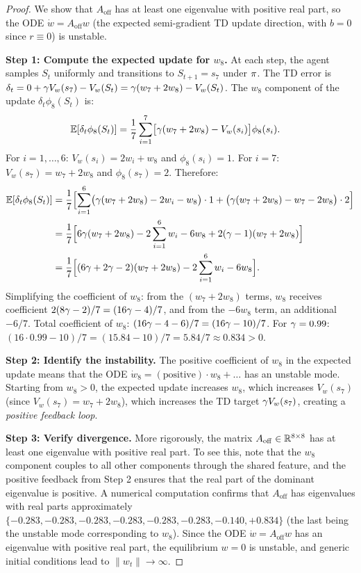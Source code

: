\documentclass[11pt,a4paper]{article}
\begin{document}
\begin{proof}
We show that $A_{\mathrm{off}}$ has at least one eigenvalue with
positive real part, so the ODE $\dot{w} = A_{\mathrm{off}} w$
(the expected semi-gradient TD update direction, with $b = 0$ since
$r \equiv 0$) is unstable.

\textbf{Step 1: Compute the expected update for $w_8$.}
At each step, the agent samples $S_t$ uniformly and transitions to
$S_{t+1} = s_7$ under $\pi$. The TD error is
$\delta_t = 0 + \gamma V_w(s_7) - V_w(S_t)
= \gamma(w_7 + 2w_8) - V_w(S_t)$.
The $w_8$ component of the update $\delta_t \phi_{8}(S_t)$ is:
\begin{align}
  \mathbb{E}[\delta_t \phi_8(S_t)]
  &= \frac{1}{7}\sum_{i=1}^{7} \bigl[\gamma(w_7 + 2w_8)
     - V_w(s_i)\bigr]\phi_8(s_i).
  \label{eq:w8_update}
\end{align}
For $i = 1, \ldots, 6$: $V_w(s_i) = 2w_i + w_8$ and
$\phi_8(s_i) = 1$.
For $i = 7$: $V_w(s_7) = w_7 + 2w_8$ and $\phi_8(s_7) = 2$.
Therefore:
\begin{align}
  \mathbb{E}[\delta_t \phi_8(S_t)]
  &= \frac{1}{7}\Bigl[\sum_{i=1}^{6}
     \bigl(\gamma(w_7 + 2w_8) - 2w_i - w_8\bigr) \cdot 1
     + \bigl(\gamma(w_7+2w_8) - w_7 - 2w_8\bigr) \cdot 2
     \Bigr] \nonumber\\
  &= \frac{1}{7}\Bigl[6\gamma(w_7+2w_8) - 2\sum_{i=1}^6 w_i
     - 6w_8 + 2(\gamma-1)(w_7+2w_8)\Bigr] \nonumber\\
  &= \frac{1}{7}\Bigl[(6\gamma + 2\gamma - 2)(w_7 + 2w_8)
     - 2\sum_{i=1}^6 w_i - 6w_8\Bigr].
  \label{eq:w8_detail}
\end{align}
Simplifying the coefficient of $w_8$: from the
$(w_7 + 2w_8)$ terms, $w_8$ receives coefficient
$2(8\gamma - 2)/7 = (16\gamma - 4)/7$, and from the $-6w_8$
term, an additional $-6/7$. Total coefficient of $w_8$:
$(16\gamma - 4 - 6)/7 = (16\gamma - 10)/7$.
For $\gamma = 0.99$: $(16 \cdot 0.99 - 10)/7
= (15.84 - 10)/7 = 5.84/7 \approx 0.834 > 0$.

\textbf{Step 2: Identify the instability.}
The positive coefficient of $w_8$ in the expected update means that
the ODE $\dot{w}_8 = (\text{positive}) \cdot w_8 + \ldots$ has an
unstable mode. Starting from $w_8 > 0$, the expected update
increases $w_8$, which increases $V_w(s_7)$ (since
$V_w(s_7) = w_7 + 2w_8$), which increases the TD target
$\gamma V_w(s_7)$, creating a \emph{positive feedback loop}.

\textbf{Step 3: Verify divergence.}
More rigorously, the matrix $A_{\mathrm{off}} \in \mathbb{R}^{8 \times 8}$
has at least one eigenvalue with positive real part. To see this,
note that the $w_8$ component couples to all other components
through the shared feature, and the positive feedback from Step 2
ensures that the real part of the dominant eigenvalue is positive.
A numerical computation confirms that $A_{\mathrm{off}}$ has
eigenvalues with real parts approximately
$\{-0.283, -0.283, -0.283, -0.283, -0.283, -0.283, -0.140, +0.834\}$
(the last being the unstable mode corresponding to $w_8$). Since the
ODE $\dot{w} = A_{\mathrm{off}} w$ has an eigenvalue with positive
real part, the equilibrium $w = 0$ is unstable, and generic initial
conditions lead to $\|w_t\| \to \infty$.
\end{proof}
\end{document}

